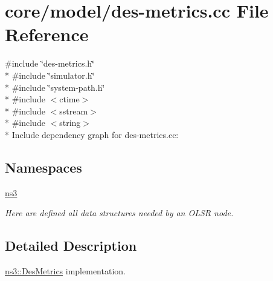 \hypertarget{des-metrics_8cc}{}\section{core/model/des-\/metrics.cc File Reference}
\label{des-metrics_8cc}
{\ttfamily \#include \char`\"{}des-\/metrics.\+h\char`\"{}}\\*
{\ttfamily \#include \char`\"{}simulator.\+h\char`\"{}}\\*
{\ttfamily \#include \char`\"{}system-\/path.\+h\char`\"{}}\\*
{\ttfamily \#include $<$ctime$>$}\\*
{\ttfamily \#include $<$sstream$>$}\\*
{\ttfamily \#include $<$string$>$}\\*
Include dependency graph for des-\/metrics.cc\+:
\subsection*{Namespaces}
\begin{DoxyCompactItemize}
\item 
 \hyperlink{namespacens3}{ns3}
\begin{DoxyCompactList}\small\item\em Here are defined all data structures needed by an O\+L\+SR node. \end{DoxyCompactList}\end{DoxyCompactItemize}


\subsection{Detailed Description}
\hyperlink{classns3_1_1DesMetrics}{ns3\+::\+Des\+Metrics} implementation. 